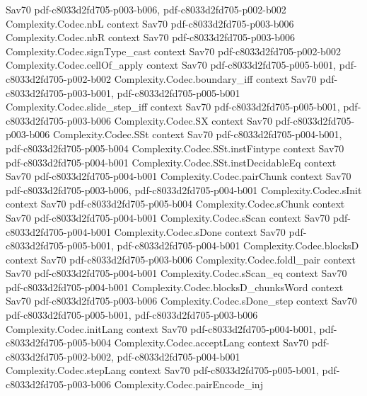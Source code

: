 \begin{theorem}
  {Sav70}
  {pdf-c8033d2fd705-p003-b006,
    pdf-c8033d2fd705-p002-b002}
\proofstep
  {Complexity.Codec.nbL}
  {context}
  {Sav70}
  {pdf-c8033d2fd705-p003-b006}
\proofstep
  {Complexity.Codec.nbR}
  {context}
  {Sav70}
  {pdf-c8033d2fd705-p003-b006}
\proofstep
  {Complexity.Codec.signType_cast}
  {context}
  {Sav70}
  {pdf-c8033d2fd705-p002-b002}
\proofstep
  {Complexity.Codec.cellOf_apply}
  {context}
  {Sav70}
  {pdf-c8033d2fd705-p005-b001,
    pdf-c8033d2fd705-p002-b002}
\proofstep
  {Complexity.Codec.boundary_iff}
  {context}
  {Sav70}
  {pdf-c8033d2fd705-p003-b001,
    pdf-c8033d2fd705-p005-b001}
\proofstep
  {Complexity.Codec.slide_step_iff}
  {context}
  {Sav70}
  {pdf-c8033d2fd705-p005-b001,
    pdf-c8033d2fd705-p003-b006}
\proofstep
  {Complexity.Codec.SX}
  {context}
  {Sav70}
  {pdf-c8033d2fd705-p003-b006}
\proofstep
  {Complexity.Codec.SSt}
  {context}
  {Sav70}
  {pdf-c8033d2fd705-p004-b001,
    pdf-c8033d2fd705-p005-b004}
\proofstep
  {Complexity.Codec.SSt.instFintype}
  {context}
  {Sav70}
  {pdf-c8033d2fd705-p004-b001}
\proofstep
  {Complexity.Codec.SSt.instDecidableEq}
  {context}
  {Sav70}
  {pdf-c8033d2fd705-p004-b001}
\proofstep
  {Complexity.Codec.pairChunk}
  {context}
  {Sav70}
  {pdf-c8033d2fd705-p003-b006,
    pdf-c8033d2fd705-p004-b001}
\proofstep
  {Complexity.Codec.sInit}
  {context}
  {Sav70}
  {pdf-c8033d2fd705-p005-b004}
\proofstep
  {Complexity.Codec.sChunk}
  {context}
  {Sav70}
  {pdf-c8033d2fd705-p004-b001}
\proofstep
  {Complexity.Codec.sScan}
  {context}
  {Sav70}
  {pdf-c8033d2fd705-p004-b001}
\proofstep
  {Complexity.Codec.sDone}
  {context}
  {Sav70}
  {pdf-c8033d2fd705-p005-b001,
    pdf-c8033d2fd705-p004-b001}
\proofstep
  {Complexity.Codec.blocksD}
  {context}
  {Sav70}
  {pdf-c8033d2fd705-p003-b006}
\proofstep
  {Complexity.Codec.foldl_pair}
  {context}
  {Sav70}
  {pdf-c8033d2fd705-p004-b001}
\proofstep
  {Complexity.Codec.sScan_eq}
  {context}
  {Sav70}
  {pdf-c8033d2fd705-p004-b001}
\proofstep
  {Complexity.Codec.blocksD_chunksWord}
  {context}
  {Sav70}
  {pdf-c8033d2fd705-p003-b006}
\proofstep
  {Complexity.Codec.sDone_step}
  {context}
  {Sav70}
  {pdf-c8033d2fd705-p005-b001,
    pdf-c8033d2fd705-p003-b006}
\proofstep
  {Complexity.Codec.initLang}
  {context}
  {Sav70}
  {pdf-c8033d2fd705-p004-b001,
    pdf-c8033d2fd705-p005-b004}
\proofstep
  {Complexity.Codec.acceptLang}
  {context}
  {Sav70}
  {pdf-c8033d2fd705-p002-b002,
    pdf-c8033d2fd705-p004-b001}
\proofstep
  {Complexity.Codec.stepLang}
  {context}
  {Sav70}
  {pdf-c8033d2fd705-p005-b001,
    pdf-c8033d2fd705-p003-b006}
\proofstep
  {Complexity.Codec.pairEncode_inj}

\end{theorem}
